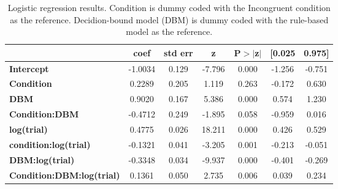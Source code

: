 \documentclass[doc, floatsintext]{apa7}
\begin{document}
\begin{table}
\begin{center}
\begin{tabular}{lcccccc}
                                              & \textbf{coef} & \textbf{std err} & \textbf{z} & \textbf{P$> |$z$|$} & \textbf{[0.025} & \textbf{0.975]}  \\
\midrule
\textbf{Intercept}                            &      -1.0034  &        0.129     &    -7.796  &         0.000        &       -1.256    &       -0.751     \\
\textbf{Condition}                            &       0.2289  &        0.205     &     1.119  &         0.263        &       -0.172    &        0.630     \\
\textbf{DBM}                                  &       0.9020  &        0.167     &     5.386  &         0.000        &        0.574    &        1.230     \\
\textbf{Condition:DBM}                        &      -0.4712  &        0.249     &    -1.895  &         0.058        &       -0.959    &        0.016     \\
\textbf{log(trial)}                           &       0.4775  &        0.026     &    18.211  &         0.000        &        0.426    &        0.529     \\
\textbf{condition:log(trial)}                 &      -0.1321  &        0.041     &    -3.205  &         0.001        &       -0.213    &       -0.051     \\
\textbf{DBM:log(trial)}                       &      -0.3348  &        0.034     &    -9.937  &         0.000        &       -0.401    &       -0.269     \\
\textbf{Condition:DBM:log(trial)}             &       0.1361  &        0.050     &     2.735  &         0.006        &        0.039    &        0.234     \\
\bottomrule
\end{tabular}
\label{tab_logistic_regression}
\end{center}
\caption{Logistic regression results. Condition is dummy
    coded with the Incongruent condition as the reference.
    Decidion-bound model (DBM) is dummy coded with the
    rule-based model as the reference.
}
\end{table}
\end{document}
